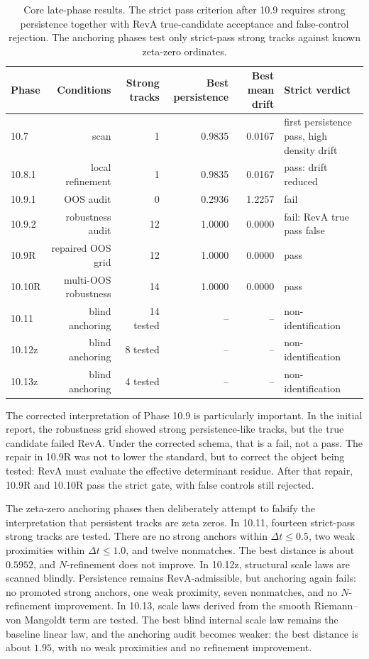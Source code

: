 \documentclass[11pt]{article}
\theoremstyle{definition}
\theoremstyle{plain}
\begin{document}
\begin{table}[ht]
\centering
\small
\begin{tabular}{lrrrrl}
\toprule
Phase & Conditions & Strong tracks & Best persistence & Best mean drift & Strict verdict \\
\midrule
10.7 & scan & 1 & 0.9835 & 0.0167 & first persistence pass, high density drift \\
10.8.1 & local refinement & 1 & 0.9835 & 0.0167 & pass: drift reduced \\
10.9.1 & OOS audit & 0 & 0.2936 & 1.2257 & fail \\
10.9.2 & robustness audit & 12 & 1.0000 & 0.0000 & fail: RevA true pass false \\
10.9R & repaired OOS grid & 12 & 1.0000 & 0.0000 & pass \\
10.10R & multi-OOS robustness & 14 & 1.0000 & 0.0000 & pass \\
10.11 & blind anchoring & 14 tested & -- & -- & non-identification \\
10.12z & blind anchoring & 8 tested & -- & -- & non-identification \\
10.13z & blind anchoring & 4 tested & -- & -- & non-identification \\
\bottomrule
\end{tabular}
\caption{Core late-phase results.  The strict pass criterion after 10.9 requires strong persistence together with RevA true-candidate acceptance and false-control rejection.  The anchoring phases test only strict-pass strong tracks against known zeta-zero ordinates.}
\label{tab:core-results}
\end{table}

The corrected interpretation of Phase 10.9 is particularly important.  In the initial report, the robustness grid showed strong persistence-like tracks, but the true candidate failed RevA.  Under the corrected schema, that is a fail, not a pass.  The repair in 10.9R was not to lower the standard, but to correct the object being tested: RevA must evaluate the effective determinant residue.  After that repair, 10.9R and 10.10R pass the strict gate, with false controls still rejected.

The zeta-zero anchoring phases then deliberately attempt to falsify the interpretation that persistent tracks are zeta zeros.  In 10.11, fourteen strict-pass strong tracks are tested.  There are no strong anchors within $\Delta t\le 0.5$, two weak proximities within $\Delta t\le 1.0$, and twelve nonmatches.  The best distance is about $0.5952$, and $N$-refinement does not improve.  In 10.12z, structural scale laws are scanned blindly.  Persistence remains RevA-admissible, but anchoring again fails: no promoted strong anchors, one weak proximity, seven nonmatches, and no $N$-refinement improvement.  In 10.13, scale laws derived from the smooth Riemann--von Mangoldt term are tested.  The best blind internal scale law remains the baseline linear law, and the anchoring audit becomes weaker: the best distance is about $1.95$, with no weak proximities and no refinement improvement.
\end{document}
